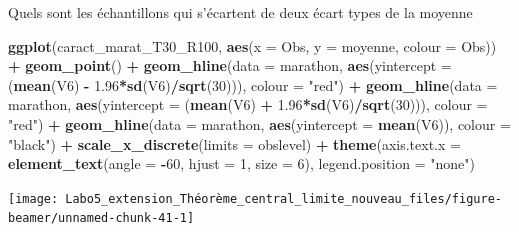 \documentclass[ignorenonframetext,]{beamer}
\newenvironment{Shaded}{\begin{snugshade}}{\end{snugshade}}
\newcommand{\KeywordTok}[1]{\textcolor[rgb]{0.13,0.29,0.53}{\textbf{#1}}}
\newcommand{\DataTypeTok}[1]{\textcolor[rgb]{0.13,0.29,0.53}{#1}}
\newcommand{\DecValTok}[1]{\textcolor[rgb]{0.00,0.00,0.81}{#1}}
\newcommand{\FloatTok}[1]{\textcolor[rgb]{0.00,0.00,0.81}{#1}}
\newcommand{\StringTok}[1]{\textcolor[rgb]{0.31,0.60,0.02}{#1}}
\newcommand{\OperatorTok}[1]{\textcolor[rgb]{0.81,0.36,0.00}{\textbf{#1}}}
\newcommand{\NormalTok}[1]{#1}
\begin{document}
\begin{frame}[fragile]{Quels sont les échantillons qui s'écartent de
deux écart types de la moyenne}

\begin{Shaded}
\begin{Highlighting}[]
\KeywordTok{ggplot}\NormalTok{(caract_marat_T30_R100, }\KeywordTok{aes}\NormalTok{(}\DataTypeTok{x =}\NormalTok{ Obs, }\DataTypeTok{y =}\NormalTok{ moyenne, }\DataTypeTok{colour =}\NormalTok{ Obs)) }\OperatorTok{+}
\StringTok{  }\KeywordTok{geom_point}\NormalTok{() }\OperatorTok{+}
\StringTok{  }\KeywordTok{geom_hline}\NormalTok{(}\DataTypeTok{data =}\NormalTok{ marathon, }\KeywordTok{aes}\NormalTok{(}\DataTypeTok{yintercept =}\NormalTok{ (}\KeywordTok{mean}\NormalTok{(V6) }\OperatorTok{-}\StringTok{ }\FloatTok{1.96}\OperatorTok{*}\KeywordTok{sd}\NormalTok{(V6)}\OperatorTok{/}\KeywordTok{sqrt}\NormalTok{(}\DecValTok{30}\NormalTok{))), }\DataTypeTok{colour =} \StringTok{"red"}\NormalTok{) }\OperatorTok{+}
\StringTok{  }\KeywordTok{geom_hline}\NormalTok{(}\DataTypeTok{data =}\NormalTok{ marathon, }\KeywordTok{aes}\NormalTok{(}\DataTypeTok{yintercept =}\NormalTok{ (}\KeywordTok{mean}\NormalTok{(V6) }\OperatorTok{+}\StringTok{ }\FloatTok{1.96}\OperatorTok{*}\KeywordTok{sd}\NormalTok{(V6)}\OperatorTok{/}\KeywordTok{sqrt}\NormalTok{(}\DecValTok{30}\NormalTok{))), }\DataTypeTok{colour =} \StringTok{"red"}\NormalTok{) }\OperatorTok{+}
\StringTok{  }\KeywordTok{geom_hline}\NormalTok{(}\DataTypeTok{data =}\NormalTok{ marathon, }\KeywordTok{aes}\NormalTok{(}\DataTypeTok{yintercept =} \KeywordTok{mean}\NormalTok{(V6)), }\DataTypeTok{colour =} \StringTok{"black"}\NormalTok{) }\OperatorTok{+}
\StringTok{  }\KeywordTok{scale_x_discrete}\NormalTok{(}\DataTypeTok{limits =}\NormalTok{ obslevel) }\OperatorTok{+}
\StringTok{  }\KeywordTok{theme}\NormalTok{(}\DataTypeTok{axis.text.x =} \KeywordTok{element_text}\NormalTok{(}\DataTypeTok{angle =} \OperatorTok{-}\DecValTok{60}\NormalTok{, }\DataTypeTok{hjust =} \DecValTok{1}\NormalTok{, }\DataTypeTok{size =} \DecValTok{6}\NormalTok{), }\DataTypeTok{legend.position =} \StringTok{"none"}\NormalTok{)}
\end{Highlighting}
\end{Shaded}

\texttt{[image: Labo5\_extension\_Théorème\_central\_limite\_nouveau\_files/figure-beamer/unnamed-chunk-41-1]}

\end{frame}
\end{document}
